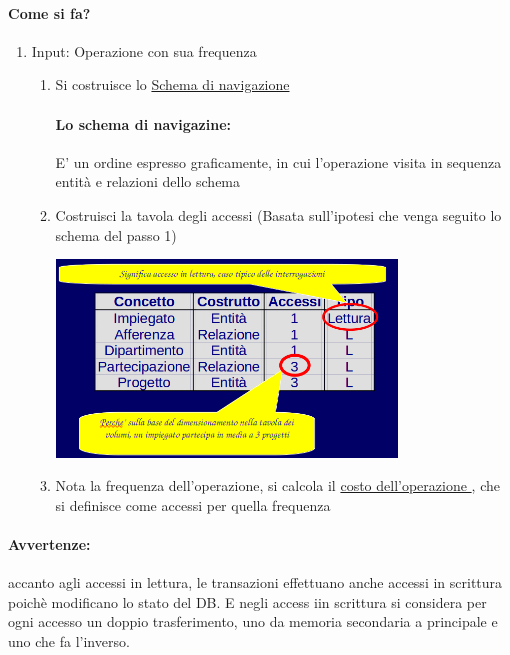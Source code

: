 \documentclass[12pt, a4paper, openany, twoside]{book}
\begin{document}
\paragraph{Come si fa?}
\begin{enumerate}
	\item Input: Operazione con sua frequenza
		\begin{enumerate}
			\item Si costruisce lo \underline{Schema di navigazione}
			\paragraph{Lo schema di navigazine:} E' un ordine espresso 
			graficamente, in cui l'operazione visita in sequenza entità e relazioni
			dello schema
			\item Costruisci la tavola degli accessi (Basata sull'ipotesi
			che venga seguito lo schema del passo 1)
			\begin{center}
			\includegraphics[width=0.75\textwidth]{12}
			\end{center}
			\item Nota la frequenza dell'operazione, si calcola il \underline{
			costo dell'operazione
			}, che si definisce come accessi per quella frequenza

		\end{enumerate}
\end{enumerate}
\paragraph{Avvertenze:} accanto agli accessi in lettura, le transazioni effettuano
anche accessi in scrittura poichè modificano lo stato del DB.
E negli access iin scrittura si considera per ogni accesso un doppio trasferimento,
uno da memoria secondaria a principale e uno che fa l'inverso.
\end{document}
